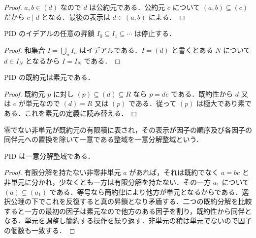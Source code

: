 \begin{proof}
$a,b\in(d)$ なので $d$ は公約元である．公約元 $c$ について $(a,b)\subseteq(c)$ だから $c\mid d$ となる．最後の表示は $d\in(a,b)$ による．
\end{proof}
\begin{prop}[PIDの昇鎖条件]
PID のイデアルの任意の昇鎖 $I_0\subseteq I_1\subseteq\cdots$ は停止する．
\end{prop}
\begin{proof}
和集合 $I=\bigcup_n I_n$ はイデアルである．$I=(d)$ と書くとある $N$ について $d\in I_N$ となるから $I=I_N$ である．
\end{proof}
\begin{prop}[PIDにおける既約元と素元]
PID の既約元は素元である．
\end{prop}
\begin{proof}
既約元 $p$ に対し $(p)\subseteq(d)\subseteq R$ なら $p=de$ である．既約性から $d$ 又は $e$ が単元なので $(d)=R$ 又は $(p)$ である．従って $(p)$ は極大であり素である．これを素元の定義に読み替える．
\end{proof}
\begin{defn}[一意分解整域]
零でない非単元が既約元の有限積に表され，その表示が因子の順序及び各因子の同伴元への置換を除いて一意である整域を一意分解整域という．
\end{defn}
\begin{prop}[PIDの一意分解]
PID は一意分解整域である．
\end{prop}
\begin{proof}
有限分解を持たない非零非単元 $a$ があれば，それは既約でなく $a=bc$ と非単元に分かれ，少なくとも一方は有限分解を持たない．その一方 $a_1$ について $(a)\subsetneq(a_1)$ である．等号なら簡約律により他方が単元となるからである．選択公理の下でこれを反復すると真の昇鎖となり矛盾する．二つの既約分解を比較すると一方の最初の因子は素元なので他方のある因子を割り，既約性から同伴となる．単元を調整し簡約する操作を繰り返す．非単元の積は単元でないので因子の個数も一致する．
\end{proof}
